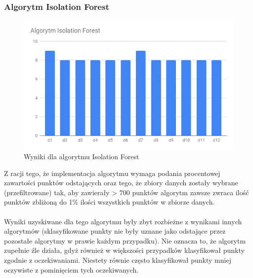 \documentclass[eng,printmode]{mgr}
\begin{document}
\subsubsection{Algorytm Isolation Forest}
 \begin{figure}[H]
  \begin{center}
  \includegraphics[scale=0.7]{r_if}
  \end{center}
  \caption{Wyniki dla algorytmu Isolation Forest}
  \label{fig:r_if}
\end{figure}
Z racji tego, że implementacja algorytmu wymaga podania procentowej zawartości punktów odstających oraz tego, że zbiory danych zostały wybrane (przefiltrowane) tak, aby zawierały > 700 punktów algorytm zawsze zwraca ilość punktów zbliżoną do 1\% ilości wszystkich punktów w zbiorze danych.
\\\\
Wyniki uzyskiwane dla tego algorytmu były zbyt rozbieżne z wynikami innych algorytmów (sklasyfikowane punkty nie były uznane jako odstające przez pozostałe algorytmy w prawie każdym przypadku). Nie oznacza to, że algorytm zupełnie źle działa, gdyż również w większości przypadków klasyfikował punkty zgodnie z oczekiwaniami. Niestety równie często klasyfikował punkty mniej oczywiste z pominięciem tych oczekiwanych.
 
\end{document}

